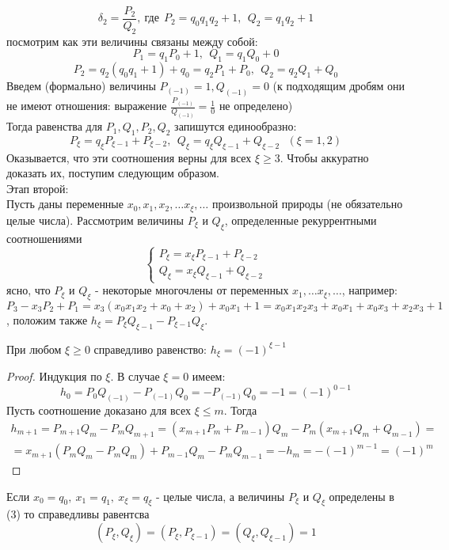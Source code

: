     \[\delta_2=\frac{P_2}{Q_2},\ \text{где}\ \ P_2=q_0 q_1 q_2+1,\ \ Q_2=q_1 q_2+1\]
    посмотрим как эти величины связаны между собой:
    \[P_1=q_1 P_0+1,\ \ Q_1=q_1 Q_0+0\]
    \[P_2=q_2 (q_0q_1+1)+q_0=q_2 P_1+P_0,\ \ Q_2=q_2 Q_1+Q_0\]
    Введем (формально) величины $P_{(-1)}=1, Q_{(-1)}=0$ (к подходящим дробям они не имеют отношения: выражение $\frac{P_{(-1)}}{Q_{(-1)}}=\frac{1}{0}$ не определено)\\
    Тогда равенства для $P_1, Q_1, P_2, Q_2$ запишутся единообразно:
    \[P_{\xi}=q_{\xi}P_{\xi-1}+P_{\xi-2},\ \ Q_{\xi}=q_{\xi}Q_{\xi-1}+Q_{\xi-2}\ \ \ (\xi=1,2)\]
    Оказывается, что эти соотношения верны для всех $\xi\geq 3$. Чтобы аккуратно доказать их, поступим следующим образом.
    \\Этап второй:\\
    Пусть даны переменные $x_0, x_1, x_2,\dots x_{\xi}, \dots$ произвольной природы (не обязательно целые числа). Рассмотрим величины $P_{\xi}$ и $Q_{\xi}$, определенные рекуррентными соотношениями
    \begin{equation} \label{equation3}
        \begin{cases}
            P_{\xi}=x_{\xi} P_{\xi-1}+P_{\xi-2}\\
            Q_{\xi}=x_{\xi} Q_{\xi-1}+Q_{\xi-2}
        \end{cases}
    \end{equation}
    ясно, что $P_{\xi}$ и $Q_{\xi}$ - некоторые многочлены от переменных $x_1,\dots x_{\xi},\dots$, например: $P_3-x_3P_2+P_1=x_3(x_0x_1x_2+x_0+x_2)+x_0x_1+1=x_0x_1x_2x_3+x_0x_1+x_0x_3+x_2x_3+1$, положим также $h_{\xi}=P_{\xi}Q_{\xi-1}-P_{\xi-1}Q_{\xi}$.
    \begin{lemma}\label{lemma7.1}
        При любом $\xi\geq 0$ справедливо равенство: $h_{\xi}=(-1)^{\xi-1}$
    \end{lemma} 
    \begin{proof}
        Индукция по $\xi$. В случае $\xi=0$ имеем: \[h_0=P_0Q_{(-1)}-P_{(-1)}Q_0=-P_{(-1)}Q_0=-1=(-1)^{0-1}\]
        Пусть соотношение доказано для всех $\xi\leq m$. Тогда 
        \begin{multline*}
            h_{m+1}=P_{m+1}Q_m-P_m Q_{m+1}=(x_{m+1}P_m+P_{m-1})Q_m-P_m(x_{m+1}Q_m+Q_{m-1})=\\=x_{m+1}(P_m Q_m-P_m Q_m)+P_{m-1}Q_m-P_m Q_{m-1}=-h_m=-(-1)^{m-1}=(-1)^m
        \end{multline*}
    \end{proof} 
    \begin{lemma}\label{lemma7.2}
        Если $x_0=q_0,\ x_1=q_1,\ x_{\xi}=q_{\xi}$ - целые числа, а величины $P_{\xi}$ и $Q_{\xi}$ определены в (3) то справедливы равентсва \[(P_{\xi},Q_{\xi})=(P_{\xi},P_{\xi-1})=(Q_{\xi},Q_{\xi-1})=1\]
    \end{lemma} 
